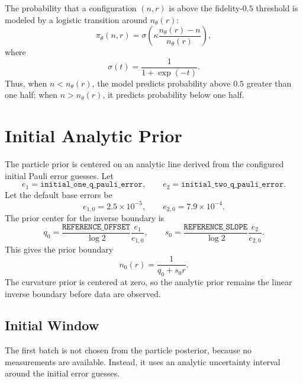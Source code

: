 \documentclass[11pt]{article}
\begin{document}
The probability that a configuration $(n,r)$ is above the fidelity-$0.5$
threshold is modeled by a logistic transition around $n_\theta(r)$:
\[
    \pi_\theta(n,r)
    =
    \sigma\left(
        \kappa \frac{n_\theta(r)-n}{n_\theta(r)}
    \right),
\]
where
\[
    \sigma(t)=\frac{1}{1+\exp(-t)}.
\]
Thus, when $n<n_\theta(r)$, the model predicts probability above $0.5$ greater
than one half; when $n>n_\theta(r)$, it predicts probability below one half.

\section{Initial Analytic Prior}

The particle prior is centered on an analytic line derived from the configured
initial Pauli error guesses. Let
\[
    e_1 = \texttt{initial\_one\_q\_pauli\_error},
    \qquad
    e_2 = \texttt{initial\_two\_q\_pauli\_error}.
\]
Let the default base errors be
\[
    e_{1,0}=2.5\times 10^{-5},
    \qquad
    e_{2,0}=7.9\times 10^{-4}.
\]
The prior center for the inverse boundary is
\[
    q_0 =
    \frac{\texttt{REFERENCE\_OFFSET}}{\log 2}
    \frac{e_1}{e_{1,0}},
    \qquad
    s_0 =
    \frac{\texttt{REFERENCE\_SLOPE}}{\log 2}
    \frac{e_2}{e_{2,0}}.
\]
This gives the prior boundary
\[
    n_0(r)=\frac{1}{q_0+s_0 r}.
\]
The curvature prior is centered at zero, so the analytic prior remains the
linear inverse boundary before data are observed.

\subsection{Initial Window}

The first batch is not chosen from the particle posterior, because no
measurements are available. Instead, it uses an analytic uncertainty interval
around the initial error guesses.
\end{document}
